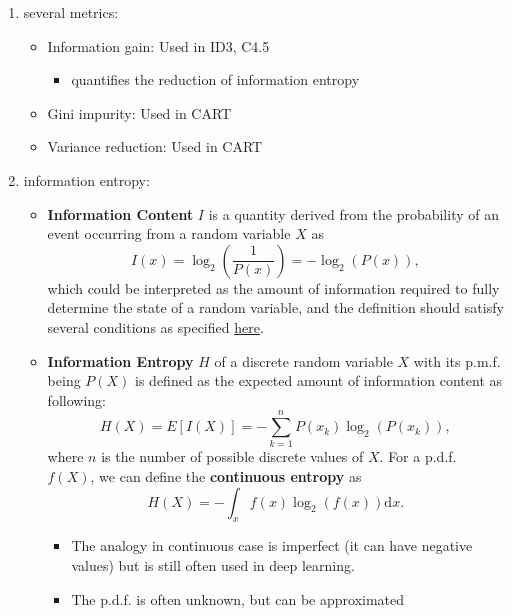 \documentclass[twocolumn,landscape,10pt]{article}
\theoremstyle{definition}
\begin{document}
\begin{enumerate}
    \item several metrics:
        \begin{itemize}
            \item Information gain: Used in ID3, C4.5
                \begin{itemize}
                    \item quantifies the reduction of information entropy
                \end{itemize} 
            \item Gini impurity: Used in CART
            \item Variance reduction: Used in CART
        \end{itemize} 
    \item information entropy:
        \begin{itemize}
            \item \textbf{Information Content} $I$ is a quantity derived from the
                probability of an event occurring from a random variable $X$ as
                \[
                    I(x)=\log_2(\frac{1}{P(x)})=-\log_2(P(x)),
                \]
                which could be interpreted as the amount of information required
                to fully determine the state of a random variable, and the
                definition should satisfy several conditions as specified
                \href{https://en.wikipedia.org/wiki/Entropy_(information_theory)#Characterization}{here}.
            \item \textbf{Information Entropy} $H$ of a discrete random variable
                $X$ with its p.m.f. being $P(X)$ is defined as the 
                expected amount of information content as following:
                \[
                    H(X)=E[I(X)]=-\sum_{k=1}^{n} P(x_k)\log_2(P(x_k)),
                \]
                where $n$ is the number of possible discrete values of $X$.
                For a p.d.f. $f(X)$, we can define the
                \textbf{continuous entropy} as
                \[
                    H(X)=-\int_{x} f(x)\log_2(f(x))\mathrm{d}x.
                \]
                \begin{itemize}
                    \item The analogy in continuous case is imperfect (it can
                        have negative values) but is still often used in deep
                        learning.
                    \item The p.d.f. is often unknown, but can be approximated

\end{itemize}
\end{itemize}
\end{enumerate}
\end{document}
